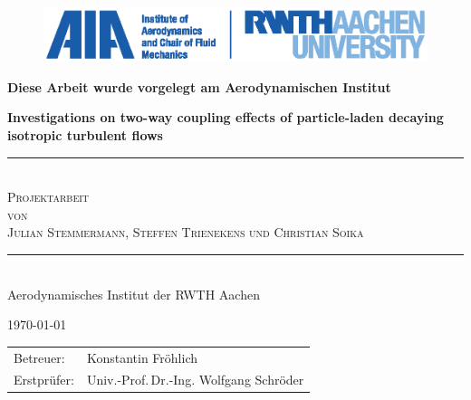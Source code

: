 \documentclass[11pt,a4paper,openany,oneside,parskip=half*]{article}
\newcommand{\HRule}{\rule{\linewidth}{0.5mm}}  %
\begin{document}
\begin{titlepage}
\begin{figure}[htp]
\vspace*{-3cm} 
\hspace*{2.7cm}  
\includegraphics{./Titelseite/rwth_aia_en_rgb.eps}
\end{figure}
\begin{center}
\textbf{Diese Arbeit wurde vorgelegt am Aerodynamischen Institut}
\end{center}
\begin{center} %
\vspace*{4.2cm} %
{ \huge \bfseries Investigations on two-way coupling effects of particle-laden decaying isotropic turbulent flows}\\[0.3cm] %
\HRule \\[0.5cm] %
\textsc{\Large{Projektarbeit}}\\ %
\textsc{\Large{von}}\\
\textsc{\LARGE{Julian Stemmermann, Steffen Trienekens und Christian Soika}}\\[0.5cm]
\HRule \\[0.4cm]
{\Large{Aerodynamisches Institut der RWTH Aachen}}\\[.5cm]
\begin{otherlanguage}{ngerman}
{\large \today} \\[1.5cm] %
\end{otherlanguage}
\vfill %
\begin{flushleft} \large  %
\begin{tabular}{ll} %
Betreuer: &Konstantin Fr\"ohlich \\
Erstpr\"ufer: &Univ.-Prof.\,Dr.-Ing. Wolfgang Schr\"oder
\end{tabular}
\end{flushleft}
\vfill %
\end{center}
\end{titlepage}
\end{document}
